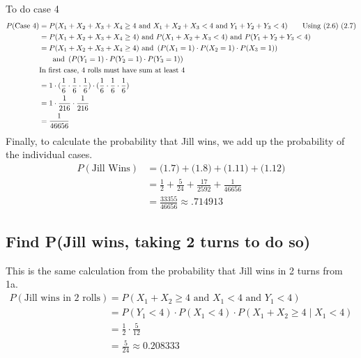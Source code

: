 \documentclass{article}
\numberwithin{equation}{section}
\newcommand{\A}{\text{ and }}
\newcommand{\eqname}[1]{\tag*{#1}}%
\begin{document}
To do case 4
\begin{align} 
	    \label{Case 4}
	    P(\text{Case 4}) &= P(X_1 + X_2 + X_3 + X_4 \geq 4 \A X_1 + X_2 + X_3 < 4 \A Y_1 + Y_2 + Y_3 < 4) \eqname{Using (2.6) (2.7)} \\
	    &= P(X_1 + X_2 + X_3 + X_4 \geq 4) \A P(X_1 + X_2 + X_3 < 4) \A P(Y_1 + Y_2 + Y_3 < 4) \eqname{} \\
	    &= P(X_1 + X_2 + X_3 + X_4 \geq 4) \A \left(P(X_1 = 1) \cdot P(X_2 = 1) \cdot P(X_3 = 1) \right) \eqname{} \\
	    & \indent \A \left(P(Y_1 = 1) \cdot P(Y_2 = 1) \cdot P(Y_3 = 1) \right) \eqname{} \\
	    & \text{In first case, 4 rolls must have sum at least 4} \eqname{} \\
	    &= 1 \cdot (\frac{1}{6} \cdot \frac{1}{6} \cdot \frac{1}{6}) \cdot (\frac{1}{6} \cdot \frac{1}{6} \cdot \frac{1}{6}) \eqname{} \\
	    &= 1 \cdot \frac{1}{216} \cdot \frac{1}{216} \eqname{} \\
	    &= \frac{1}{46656}
\end{align}
Finally, to calculate the probability that Jill wins, we add up the probability of the individual cases.
\begin{align} 
	    \label{P(Jill Wins)}
	    P(\text{Jill Wins}) &= \text{(1.7)} + \text{(1.8)} + \text{(1.11)} + \text{(1.12)} \eqname{Using (2.4)} \\
	    &= \frac{1}{2} + \frac{5}{24} + \frac{17}{2592} + \frac{1}{46656} \eqname{} \\
	    &= \frac{33355}{46656} \approx .714913
\end{align}

\subsection{Find P(Jill wins, taking 2 turns to do so)}

This is the same calculation from the probability that Jill wins in 2 turns from 1a.
\begin{align}
        P(\text{Jill wins in 2 rolls}) &= P(X_1 + X_2 \geq 4 \A X_1 < 4 \A Y_1 < 4) \eqname{} \\
        &= P(Y_1 < 4) \cdot P(X_1 < 4) \cdot P(X_1 + X_2 \geq 4 \mid X_1 < 4) \eqname{} \\
        &= \frac{1}{2} \cdot \frac{5}{12} \eqname{} \\
        &=\frac{5}{24} \approx 0.208333
\end{align}
\end{document}
